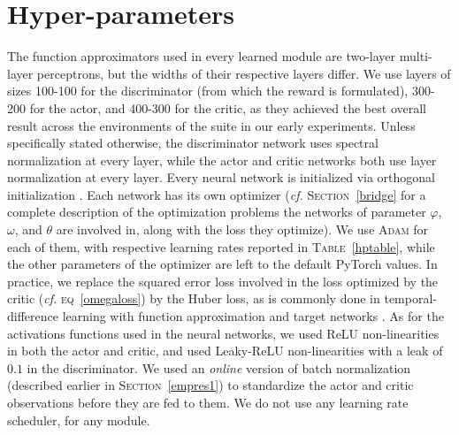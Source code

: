 

\section{Hyper-parameters}
\label{hps}

The function approximators used in every learned module
are two-layer multi-layer perceptrons, but the widths of their respective layers
differ.
We use layers of sizes 100-100 for the discriminator (from which the reward is formulated),
300-200 for the actor, and 400-300 for the critic, as they achieved the best overall
result across the environments of the suite in our early experiments.
Unless specifically stated otherwise,
the discriminator network uses spectral normalization \cite{Miyato2018-wc}
at every layer,
while the actor and critic networks both use layer normalization \cite{Ba2016-bs}
at every layer.
Every neural network is initialized via orthogonal initialization \cite{Saxe2013-rm}.
Each network has its own optimizer (\textit{cf.} \textsc{Section}~\ref{bridge}
for a complete description of the optimization problems the networks
of parameter $\varphi$, $\omega$, and $\theta$ are involved in,
along with the loss they optimize).
We use \textsc{Adam} \cite{Kingma2014-op} for each of them,
with respective learning rates reported in \textsc{Table}~\ref{hptable},
while the other parameters of the optimizer are left to the default
PyTorch \cite{Paszke2019-zf} values.
In practice, we replace the squared error loss involved in the loss optimized by the critic
(\textit{cf.} \textsc{eq}~\ref{omegaloss})
by the Huber loss, as is commonly done in temporal-difference learning
with function approximation and target networks \cite{Mnih2013-rb,Mnih2015-iy}.
As for the activations functions used in the neural networks,
we used ReLU non-linearities in both the actor and critic,
and used Leaky-ReLU \cite{Maas2013-dw} non-linearities with a leak of $0.1$ in the discriminator.
We used an \emph{online} version of batch normalization
(described earlier in \textsc{Section}~\ref{empres1})
to standardize the actor and critic observations before they are fed to them.
We do not use any learning rate scheduler, for any module.


